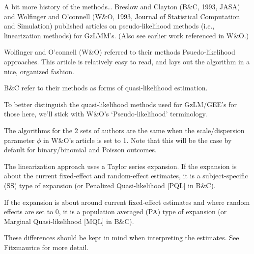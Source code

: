 \documentclass[
  9pt,
  ignorenonframetext,
]{beamer}
\begin{document}
\begin{frame}{A bit more history of the methods\ldots{}}
\protect\hypertarget{a-bit-more-history-of-the-methods}{}
Breslow and Clayton (B\&C, 1993, JASA) and Wolfinger and O'connell
(W\&O, 1993, Journal of Statistical Computation and Simulation)
published articles on pseudo-likelihood methods (i.e., linearization
methods) for GzLMM's. (Also see earlier work referenced in W\&O.)

Wolfinger and O'connell (W\&O) referred to their methods
Psuedo-likelihood approaches. This article is relatively easy to read,
and lays out the algorithm in a nice, organized fashion.

B\&C refer to their methods as forms of quasi-likelihood estimation.

To better distinguish the quasi-likelihood methods used for GzLM/GEE's
for those here, we'll stick with W\&O's `Pseudo-likelihood' terminology.

The algorithms for the 2 sets of authors are the same when the
scale/dispersion parameter \(\phi\) in W\&O's article is set to 1. Note
that this will be the case by default for binary/binomial and Poisson
outcomes.
\end{frame}

\begin{frame}{The linearization approach uses a Taylor series
expansion.}
\protect\hypertarget{the-linearization-approach-uses-a-taylor-series-expansion.}{}
If the expansion is about the current fixed-effect and random-effect
estimates, it is a subject-specific (SS) type of expansion (or Penalized
Quasi-likelihood {[}PQL{]} in B\&C).

If the expansion is about around current fixed-effect estimates and
where random effects are set to 0, it is a population averaged (PA) type
of expansion (or Marginal Quasi-likelihood {[}MQL{]} in B\&C).

These differences should be kept in mind when interpreting the
estimates. See Fitzmaurice for more detail.
\end{frame}
\end{document}
